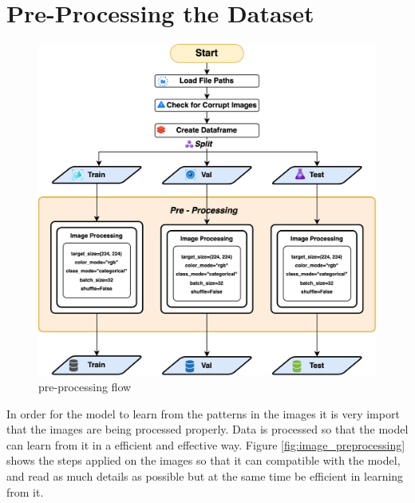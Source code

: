 \documentclass[12pt,onecolumn]{report}
\begin{document}
\section{Pre-Processing the Dataset}
\begin{figure}[h!]
    \centering
    \includegraphics[width=0.8\columnwidth]{figures/image_preprocessing_full.png}  %
    \caption{pre-processing flow} %
    \label{fig:image_preprocessing_full} %
\end{figure}

In order for the model to learn from the patterns in the images it is very import that the images are being processed properly. Data is processed so that the model can learn from it in a efficient and effective way. Figure \ref{fig:image_preprocessing} shows the steps applied on the images so that it can compatible with the model, and read as much details as possible but at the same time be efficient in learning from it.
\end{document}
